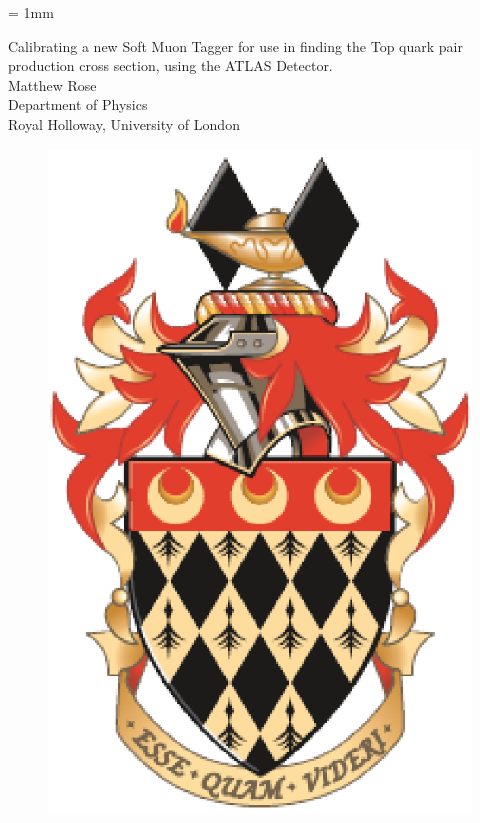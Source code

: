 \documentclass[11pt,a4paper]{report} %
\begin{document}
\unitlength = 1mm
\begin{titlepage}
\begin{center}
{\LARGE Calibrating a new Soft Muon Tagger for use in finding the Top quark pair production cross section, using the ATLAS Detector.\\}
\vspace{2cm}
{\Large Matthew Rose\\}
\vspace{1cm}
{\large Department of Physics\\}
{\large Royal Holloway, University of London\\}

\end{center}
\vspace{1cm}

\begin{figure}[ht]
\begin{center}
\includegraphics[scale=0.2]{images/rhulcrestsmall.eps}
\end{center}
\end{figure}


\end{titlepage}
\end{document}

